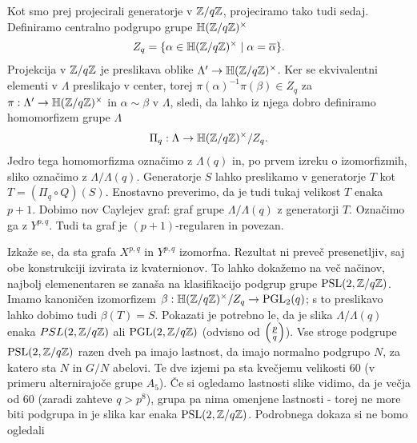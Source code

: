 Kot smo prej projecirali generatorje v \(\mathbb Z/q\mathbb Z\), projeciramo tako tudi sedaj. Definiramo centralno podgrupo grupe \(\mathbb H(\mathbb Z/q\mathbb Z)^\times\)
\begin{align*}
    Z_q = \{\alpha \in \mathbb H(\mathbb Z/q\mathbb Z)^\times \mid \alpha = \overline\alpha\}.
\end{align*}
Projekcija v \(\mathbb Z/q\mathbb Z\) je preslikava oblike \(\Lambda' \to\mathbb H(\mathbb Z/q\mathbb Z)^\times\). Ker se ekvivalentni elementi v \(\Lambda\) preslikajo v center, torej \(\pi(\alpha)^{-1}\pi(\beta)\in Z_q\) za \(\pi:\Lambda' \to\mathbb H(\mathbb Z/q\mathbb Z)^\times\) in \(\alpha\sim\beta\) v \(\Lambda\), sledi, da lahko iz njega dobro definiramo homomorfizem grupe \(\Lambda\)
\begin{align*}
    \Pi_q: \Lambda \to \mathbb H(\mathbb Z/q\mathbb Z)^\times/Z_q.
\end{align*}
Jedro tega homomorfizma označimo z \(\Lambda(q)\) in, po prvem izreku o izomorfizmih, sliko označimo z \(\Lambda/\Lambda(q)\). Generatorje \(S\) lahko preslikamo v generatorje \(T\) kot \(T=(\Pi_q \circ Q)(S)\). Enostavno preverimo, da je tudi tukaj velikost \(T\) enaka \(p+1\). Dobimo nov Caylejev graf: graf grupe \(\Lambda/\Lambda(q)\) z generatorji \(T\). Označimo ga z \(Y^{p,q}\). Tudi ta graf je \((p+1)\)-regularen in povezan.

Izkaže se, da sta grafa \(X^{p,q}\) in \(Y^{p,q}\) izomorfna. Rezultat ni preveč presenetljiv, saj obe konstrukciji izvirata iz kvaternionov. To lahko dokažemo na več načinov, najbolj elemenentaren se zanaša na klasifikacijo podgrup grupe \(\operatorname{PSL}(2, \mathbb Z/q\mathbb Z)\). Imamo kanoničen izomorfizem \(\beta:\mathbb H(\mathbb Z/q\mathbb Z)^\times /Z_q\to \operatorname{PGL}_2(q)\); s to preslikavo lahko dobimo tudi \(\beta(T)=S\). Pokazati je potrebno le, da je slika \(\Lambda/\Lambda(q)\) enaka \(PSL(2, \mathbb Z/q\mathbb Z)\) ali \(\operatorname{PGL}(2, \mathbb Z/q\mathbb Z)\) (odvisno od \(\left(\frac{p}{q}\right)\)).  Vse stroge podgrupe \(\operatorname{PSL}(2, \mathbb Z/q\mathbb Z)\) razen dveh pa imajo lastnost, da imajo normalno podgrupo \(N\), za katero sta \(N\) in \(G/N\) abelovi. Te dve izjemi pa sta kvečjemu velikosti 60 (v primeru alternirajoče grupe \(A_5\)). Če si ogledamo lastnosti slike vidimo, da je večja od \(60\) (zaradi zahteve \(q>p^8\)), grupa pa nima omenjene lastnosti - torej ne more biti podgrupa in je slika kar enaka \(\operatorname{PSL}(2, \mathbb Z/q\mathbb Z)\). Podrobnega dokaza si ne bomo ogledali


